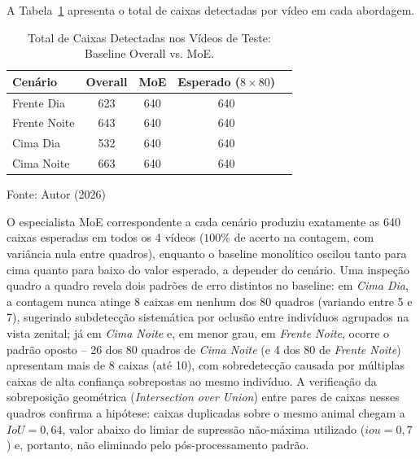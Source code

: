 \documentclass[12pt,fleqn]{article}
\begin{document}
A Tabela~\ref{tab:contagem_caixas} apresenta o total de caixas detectadas por vídeo em cada abordagem.

\begin{table}[H]
\caption{Total de Caixas Detectadas nos Vídeos de Teste: Baseline Overall vs. MoE.}
\label{tab:contagem_caixas}
\centering{}
\begin{tabular*}{\textwidth}{@{\extracolsep{\fill}}lcccc}
\hline
Cenário & Overall & MoE & Esperado ($8 \times 80$) \\
\hline
Frente Dia & 623 & 640 & 640 \\
Frente Noite & 643 & 640 & 640 \\
Cima Dia & 532 & 640 & 640 \\
Cima Noite & 663 & 640 & 640 \\
\hline
\end{tabular*}
{\footnotesize\centering Fonte: Autor (2026)\par}
\end{table}

O especialista MoE correspondente a cada cenário produziu exatamente as 640 caixas esperadas em todos os 4 vídeos ($100\%$ de acerto na contagem, com variância nula entre quadros), enquanto o baseline monolítico oscilou tanto para cima quanto para baixo do valor esperado, a depender do cenário. Uma inspeção quadro a quadro revela dois padrões de erro distintos no baseline: em \textit{Cima Dia}, a contagem nunca atinge 8 caixas em nenhum dos 80 quadros (variando entre 5 e 7), sugerindo subdetecção sistemática por oclusão entre indivíduos agrupados na vista zenital; já em \textit{Cima Noite} e, em menor grau, em \textit{Frente Noite}, ocorre o padrão oposto -- 26 dos 80 quadros de \textit{Cima Noite} (e 4 dos 80 de \textit{Frente Noite}) apresentam mais de 8 caixas (até 10), com sobredetecção causada por múltiplas caixas de alta confiança sobrepostas ao mesmo indivíduo. A verificação da sobreposição geométrica (\textit{Intersection over Union}) entre pares de caixas nesses quadros confirma a hipótese: caixas duplicadas sobre o mesmo animal chegam a $IoU = 0{,}64$, valor abaixo do limiar de supressão não-máxima utilizado ($iou=0{,}7$) e, portanto, não eliminado pelo pós-processamento padrão.
\end{document}
